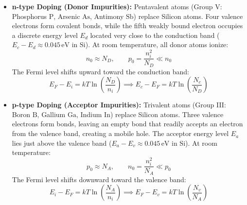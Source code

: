\documentclass[12pt,a4paper]{article}
\begin{document}
\begin{itemize}[leftmargin=*, itemsep=3.5pt]
  \item \textbf{n-type Doping (Donor Impurities):} Pentavalent atoms (Group V: Phosphorus $\text{P}$, Arsenic $\text{As}$, Antimony $\text{Sb}$) replace Silicon atoms. Four valence electrons form covalent bonds, while the fifth weakly bound electron occupies a discrete energy level $E_d$ located very close to the conduction band ($E_c - E_d \approx 0.045\,\text{eV}$ in $\text{Si}$). At room temperature, all donor atoms ionize:
  \begin{equation}
    n_0 \approx N_D, \qquad p_0 = \frac{n_i^2}{N_D} \ll n_0
  \end{equation}
  The Fermi level shifts upward toward the conduction band:
  \begin{equation}
    E_F - E_i = k T \ln\left(\frac{N_D}{n_i}\right) \implies E_c - E_F = k T \ln\left(\frac{N_c}{N_D}\right)
  \end{equation}

  \item \textbf{p-type Doping (Acceptor Impurities):} Trivalent atoms (Group III: Boron $\text{B}$, Gallium $\text{Ga}$, Indium $\text{In}$) replace Silicon atoms. Three valence electrons form bonds, leaving an empty bond that readily accepts an electron from the valence band, creating a mobile hole. The acceptor energy level $E_a$ lies just above the valence band ($E_a - E_v \approx 0.045\,\text{eV}$ in $\text{Si}$). At room temperature:
  \begin{equation}
    p_0 \approx N_A, \qquad n_0 = \frac{n_i^2}{N_A} \ll p_0
  \end{equation}
  The Fermi level shifts downward toward the valence band:
  \begin{equation}
    E_i - E_F = k T \ln\left(\frac{N_A}{n_i}\right) \implies E_F - E_v = k T \ln\left(\frac{N_v}{N_A}\right)
  \end{equation}
\end{itemize}
\end{document}
